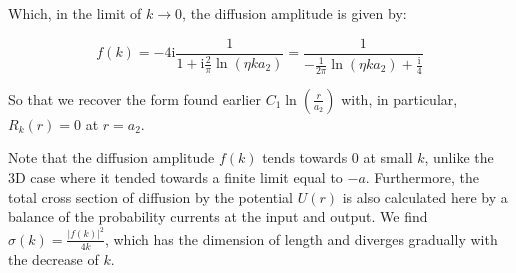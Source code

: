 \begin{enumerate}
    Which, in the limit of $k\to 0$, the diffusion amplitude is given by:

    \begin{equation}
        f(k)=-4\text{i}\frac{1}{1+\text{i}\frac{2}{\pi}\ln(\eta k a_2)}=\frac{1}{-\frac{1}{2\pi}\ln(\eta k a_2)+\frac{\text{i}}{4}}
    \end{equation}

    So that we recover the form found earlier $C_1\ln(\frac{r}{a_2})$ with, in particular, $R_k(r)=0$ at $r=a_2$.

    Note that the diffusion amplitude $f(k)$ tends towards 0 at small $k$, unlike the 3D case where it tended towards a finite limit equal to $-a$. Furthermore, the total cross section of diffusion by the potential $U(r)$ is also calculated here by a balance of the probability currents at the input and output. We find $\sigma(k)=\frac{|f(k)|^2}{4k}$, which has the dimension of length and diverges gradually with the decrease of $k$.
\end{enumerate}

